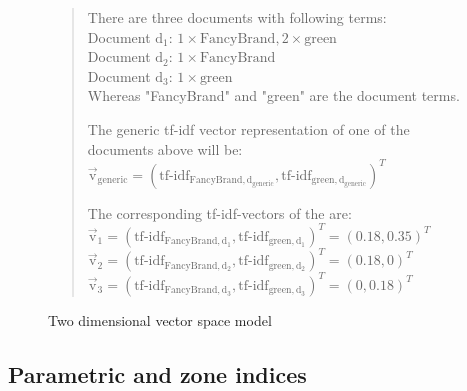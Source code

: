 \begin{figure}[h]

    \begin{quote}
        There are three documents with following terms:\\
        Document $\text{d}_1$: $1\times \text{FancyBrand}, 2\times \text{green}$\\
        Document $\text{d}_2$: $1\times \text{FancyBrand}$\\
        Document $\text{d}_3$: $1\times \text{green}$\\
        Whereas "FancyBrand" and "green" are the document terms.

        \noindent
        The generic tf-idf vector representation of one of the documents above will be:\\
        $\vec{\text{v}}_{\text{generic}} = (\text{tf-idf}_{\text{FancyBrand},\text{d}_\text{generic}}, \text{tf-idf}_{\text{green},\text{d}_\text{generic}})^T$

        \noindent
        The corresponding tf-idf-vectors of the are:\\
        $\vec{\text{v}}_1 = (\text{tf-idf}_{\text{FancyBrand},\text{d}_1}, \text{tf-idf}_{\text{green},\text{d}_1})^T = (0.18, 0.35)^T$\\
        $\vec{\text{v}}_2 = (\text{tf-idf}_{\text{FancyBrand},\text{d}_2}, \text{tf-idf}_{\text{green},\text{d}_2})^T = (0.18, 0)^T$\\
        $\vec{\text{v}}_3 = (\text{tf-idf}_{\text{FancyBrand},\text{d}_3}, \text{tf-idf}_{\text{green},\text{d}_3})^T = (0, 0.18)^T$\\
    \end{quote}

    \center

    \caption{Two dimensional vector space model}
    \label{fig:vectorspacemodel}
\end{figure}


\subsection{Parametric and zone indices}
\label{sec:parametricandzoneindices}


